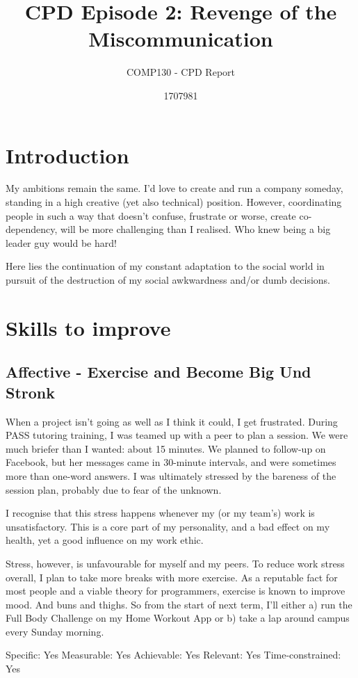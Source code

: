 \documentclass{scrartcl}
\title{CPD Episode 2: Revenge of the Miscommunication}
\subtitle{COMP130 - CPD Report}
\author{1707981}
\begin{document}
\maketitle

\section{Introduction} %
My ambitions remain the same. I'd love to create and run a company someday, standing in a high creative (yet also technical) position. However, coordinating people in such a way that doesn't confuse, frustrate or worse, create co-dependency, will be more challenging than I realised. Who knew being a big leader guy would be hard!

Here lies the continuation of my constant adaptation to the social world in pursuit of the destruction of my social awkwardness and/or dumb decisions.

\section{Skills to improve}
\subsection{Affective - Exercise and Become Big Und Stronk} %
When a project isn't going as well as I think it could, I get frustrated. During PASS tutoring training, I was teamed up with a peer to plan a session. We were much briefer than I wanted: about 15 minutes. We planned to follow-up on Facebook, but her messages came in 30-minute intervals, and were sometimes more than one-word answers. I was ultimately stressed by the bareness of the session plan, probably due to fear of the unknown.

I recognise that this stress happens whenever my (or my team's) work is unsatisfactory. This is a core part of my personality, and a bad effect on my health, yet a good influence on my work ethic.

Stress, however, is unfavourable for myself and my peers. To reduce work stress overall, I plan to take more breaks with more exercise. As a reputable fact for most people and a viable theory for programmers, exercise is known to improve mood. And buns and thighs. So from the start of next term, I'll either a) run the Full Body Challenge on my Home Workout App or b) take a lap around campus every Sunday morning.

Specific: Yes
Measurable: Yes
Achievable: Yes
Relevant: Yes
Time-constrained: Yes
\end{document}
